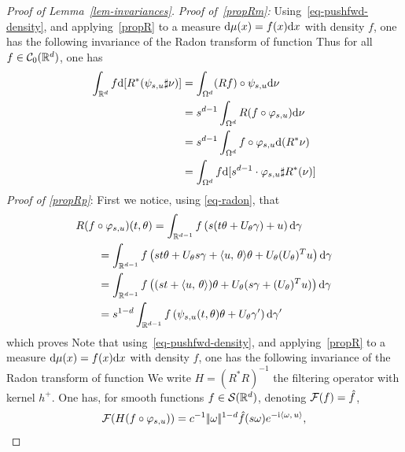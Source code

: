 \begin{proof}[Proof of Lemma~\ref{lem-invariances}]
		\fi
		\noindent\textit{Proof of~\eqref{propRm}:} 			
		Using~\eqref{eq-pushfwd-density}, and applying~\eqref{propR} to a measure $\mathrm{d}\mu(x) = f(x) \mathrm{d} x$ with density $f$, one has the following invariance of the Radon transform of function 
		Thus for all $f \in \mathcal{C}_0(\mathbb{R}^d)$, one has
		\begin{align*}
		\int_{\mathbb{R}^d} f \mathrm{d}[R^*(\psi_{s,u}\sharp \nu)]
			& = \int_{\Omega^d} (R f) \circ \psi_{s,u} \mathrm{d}\nu \\
			& = s^{d-1} \int_{\Omega^d} R (f \circ \varphi_{s,u} ) \mathrm{d}\nu \\
			& = s^{d-1} \int_{\Omega^d} f \circ \varphi_{s,u}  \mathrm{d} (R^*\nu) \\
			& = \int_{\Omega^d} f   \mathrm{d}[s^{d-1} \cdot \varphi_{s,u}\sharp  R^*(\nu)]
		\end{align*}
		\fi 		
		\noindent\textit{Proof of \eqref{propRp}}: 		
		First we notice, using \eqref{eq-radon}, that 
			\begin{align*} 
				& R( f \circ \varphi_{s,u} )(t,\theta) 
				= \int_{{\mathbb R}^{d-1} } f\left(  s(t\theta + U_\theta \gamma) + u  \right) \mathrm{d}\gamma \\
				& \qquad = \int_{{\mathbb R}^{d-1} } f\left(  st\theta + U_\theta s\gamma + \langle u,\,\theta\rangle\theta + U_\theta(U_\theta)^{T}u  \right) \mathrm{d}\gamma \\
				& \qquad = \int_{{\mathbb R}^{d-1} } f\left(  (st+\langle u,\,\theta\rangle)\theta + U_\theta (s\gamma + (U_\theta)^{T}u) \right) \mathrm{d}\gamma \\
				& \qquad = s^{1-d}  \int_{{\mathbb R}^{d-1} } f\left(  \psi_{s,u} (t,\theta) \theta + U_\theta \gamma'  \right) \mathrm{d} \gamma'
			\end{align*}
			which proves
			Note that using~\eqref{eq-pushfwd-density}, and applying~\eqref{propR} to a measure $\mathrm{d}\mu(x) = f(x) \mathrm{d} x$ with density $f$, one has the following invariance of the Radon transform of function 
		\fi %
			We write $H = (R^*R)^{-1}$ the filtering operator with kernel $h^+$. One has, for smooth functions $f \in \mathcal{S}(\mathbb{R}^d)$, denoting $\mathcal{F}(f)=\hat f$, 
			\begin{align*}
				\Ff( H(f \circ \phi_{s,u}) ) &= c^{-1}\norm{\om}^{1-d} \hat f(s\om) e^{-\imath \dotp{\om}{u}}, \\

\end{align*}
\end{proof}
